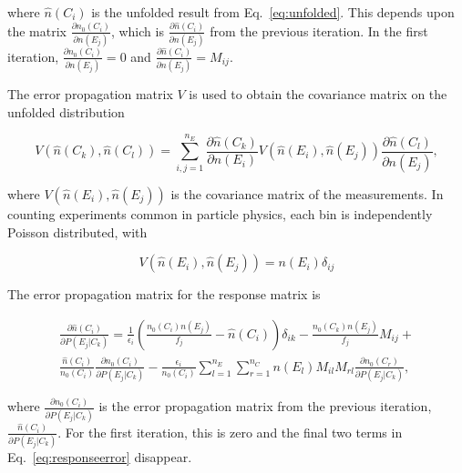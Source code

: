 \noindent where $\hat n \left(C_i\right)$ is the unfolded result from Eq.~\ref{eq:unfolded}. This depends upon the matrix $\frac{\partial n_0\left(C_i\right)}{\partial n\left(E_j\right) }$, which is $\frac{\partial \hat n\left(C_i\right) }{\partial n\left(E_j\right) }$ from the previous iteration. In the first iteration, $\frac{\partial n_0\left(C_i\right) }{\partial n\left(E_j\right) }=0$ and $\frac{\partial \hat n\left(C_i\right) }{\partial n\left(E_j\right) } = M_{ij}$.
 
 The error propagation matrix $V$ is used to obtain the covariance matrix on the unfolded distribution 
 
 \begin{equation}
 V\left(\hat n\left(C_k\right), \hat n\left(C_l\right)\right) = \sum_{i,j=1}^{n_E} \frac{\partial \hat n\left(C_k\right) }{\partial n\left(E_i\right) }  V\left(\hat n\left(E_i\right), \hat n\left(E_j\right)\right)  \frac{\partial \hat n\left(C_l\right) }{\partial n\left(E_j\right) },
 \end{equation}
 
\noindent where $V\left(\hat n\left(E_i\right), \hat n\left(E_j\right)\right)$ is the covariance matrix of the measurements. In counting experiments common in particle physics, each bin is independently Poisson distributed, with
 
 \begin{equation}
 V\left(\hat n\left(E_i\right), \hat n\left(E_j\right)\right) = n\left(E_i\right) \delta_{ij}
 \end{equation}
 
 \noindent The error propagation matrix for the response matrix is 
 
 \begin{multline}
 \frac{\partial \hat n\left(C_i\right)}{\partial P \left(E_j| C_k\right)} = \frac{1}{\epsilon_i}\left(\frac{n_0 \left(C_i\right) n\left(E_j\right)}{f_j} - \hat n \left(C_i\right) \right) \delta_{ik} - \frac{n_0 \left(C_k\right) n\left(E_j\right)}{f_j} M_{ij} + \\
  \frac{\hat n\left(C_i\right)}{n_0\left(C_i\right)} \frac{\partial n_0\left(C_i\right)}{\partial P \left(E_j| C_k\right)} - \frac{\epsilon_i}{n_0\left(C_i\right)} \sum_{l=1}^{n_E}\sum_{r=1}^{n_C} n\left(E_l\right) M_{il} M_{rl} \frac{\partial n_0 \left(C_r \right)}{\partial P \left(E_j| C_k\right)},
 \label{eq:responseerror}
 \end{multline}
 
\noindent where $ \frac{\partial n_0\left(C_i\right)}{\partial P \left(E_j| C_k\right)}$ is the error propagation matrix from the previous iteration, $\frac{\hat n\left(C_i\right)}{\partial P \left(E_j| C_k\right)}$. For the first iteration, this is zero and the final two terms in Eq.~\ref{eq:responseerror} disappear.
 
